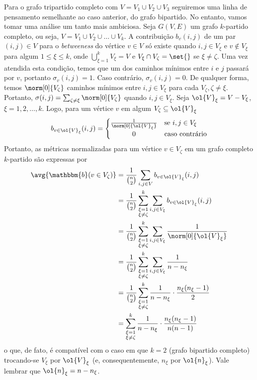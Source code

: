 \documentclass[l15, tikzdraw]{homework}
\begin{document}
	\subquest{}%
	Para o grafo tripartido completo com $V = V_1 \cup V_2 \cup V_3$ seguiremos uma linha de pensamento semelhante ao caso anterior, do grafo bipartido. No entanto, vamos tomar uma análise um tanto mais ambiciosa. Seja $G(V, E)$ um grafo $k$-partido completo, ou seja, $V = V_1 \cup V_2 \cup \dots \cup V_k$. A contribuição $b_v(i, j)$ de um par $(i, j) \in V$ para o \textit{betweeness} do vértice $v \in V$ só existe quando $i, j \in V_\xi$ e $v \notin V_\xi$ para algum $1 \le \xi \le k$, onde $\bigcup_{\xi = 1}^{k} V_\xi = V$ e $V_\xi \cap V_\zeta = \set{}$ se $\xi \neq \zeta$. Uma vez atendida esta condição, temos que um dos caminhos mínimos entre $i$ e $j$ passará por $v$, portanto $\sigma_v(i, j) = 1$. Caso contrário, $\sigma_v(i, j) = 0$. De qualquer forma, temos $\norm[0]{V_\zeta}$ caminhos mínimos entre $i, j \in V_\xi$ para cada $V_\zeta, \zeta \neq \xi$. Portanto, $\sigma(i, j) = \sum_{\zeta \neq \xi} \norm[0]{V_\zeta}$ quando $i, j \in V_\xi$. Seja $\ol{V}_\xi = V - V_\xi$, $\xi = 1, 2, \dots, k$. Logo, para um vértice $v$ em algum $V_\zeta \subseteq \ol{V}_\xi$%
	$$%
		b_{v \in \ol{V}_\xi}(i, j) = \left\{\begin{array}{@{}cl@{}}
			\frac{1}{\norm[0]{\ol{V}_\xi}} & \text{se } i,j \in V_\xi\\[1ex]
			0 & \text{caso contrário}
		\end{array}\right.
	$$%
	Portanto, as métricas normalizadas para um vértice $v \in V_\zeta$ em um grafo completo $k$-partido são expressas por%
	\begin{align*}%
		\avg{\mathbbm{b}(v \in V_\zeta)} &= \frac{1}{\binom{n}{2}} \sum_{i, j \in V} b_{v \in \ol{V}_\xi}(i, j)\\%
		&= \frac{1}{\binom{n}{2}} \sum_{\substack{\xi = 1 \\ \xi \neq \zeta}}^{k} \sum_{i, j \in V_\xi} b_{v \in \ol{V}_\xi}(i, j)\\%
		&= \frac{1}{\binom{n}{2}} \sum_{\substack{\xi = 1 \\ \xi \neq \zeta}}^{k} \sum_{i, j \in V_\xi} \frac{1}{\norm[0]{\ol{V}_\xi}}\\%
		&= \frac{1}{\binom{n}{2}} \sum_{\substack{\xi = 1 \\ \xi \neq \zeta}}^{k} \sum_{i, j \in V_\xi} \frac{1}{n - n_\xi}\\%
		&= \frac{1}{\binom{n}{2}} \sum_{\substack{\xi = 1 \\ \xi \neq \zeta}}^{k} \frac{ 1 }{ n - n_\xi } \cdot \frac{ n_\xi (n_\xi - 1) }{ 2 }\\%
		&= \sum_{\substack{\xi = 1 \\ \xi \neq \zeta}}^{k} \frac{ 1 }{ n - n_\xi } \cdot \frac{ n_\xi (n_\xi - 1) }{ n (n - 1) }%
	\end{align*}%
	o que, de fato, é compatível com o caso em que $k = 2$ (grafo bipartido completo) trocando-se $V_\xi$ por $\ol{V}_\xi$ (e, consequentemente, $n_\xi$ por $\ol{n}_\xi$). Vale lembrar que $\ol{n}_\xi = n - n_\xi$.\par
\end{document}
